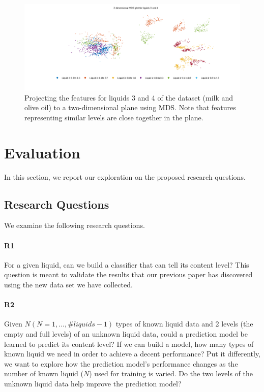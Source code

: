 \documentclass{article} %
\begin{document}
\begin{figure}[htb]
\centering
\includegraphics[width=0.8\linewidth]{mds_3_4.png}
\caption{Projecting the features for liquids 3 and 4 of the dataset (milk and olive oil) to a two-dimensional plane using MDS. Note that features representing similar levels are close together in the plane.}
\label{fig:mds}
\end{figure}

\section{Evaluation}
In this section, we report our exploration on the proposed research questions.

\subsection{Research Questions}
We examine the following research questions.

\paragraph{R1} For a given liquid, can we build a classifier that can tell its content level? This question is meant to validate the results that our previous paper has discovered using the new data set we have collected.

\paragraph{R2} Given $N (N = 1, \dots,\#liquids - 1)$ types of known liquid data and 2 levels (the empty and full levels) of an unknown liquid data, could a prediction model be learned to predict its content level? If we can build a model, how many types of known liquid we need in order to achieve a decent performance? Put it differently, we want to explore how the prediction model's performance changes as the number of known liquid ($N$) used for training is varied. Do the two levels of the unknown liquid data help improve the prediction model? 
\end{document}
